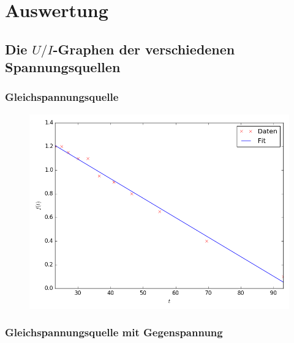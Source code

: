 \section{Auswertung}
\label{sec:Auswertung}



\subsection{Die $U/I$-Graphen der verschiedenen Spannungsquellen}

\subsubsection{Gleichspannungsquelle}
\begin{figure}[H]
	\centering
	\caption{}
	\includegraphics[width=\linewidth-150pt,height=\textheight-150pt,keepaspectratio]{Gleichstrom.png}
	\label{fig:Gleichstrom}
\end{figure}


\newpage
\subsubsection{Gleichspannungsquelle mit Gegenspannung}

